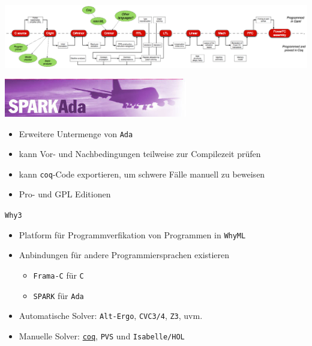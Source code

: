 \documentclass[aspectratio=169]{beamer}
\begin{document}
\begin{frame}
  \begin{center}
    \includegraphics[width=20.0cm]{compcert_diagram.png}
  \end{center}
\end{frame}
\begin{frame}
  \begin{center}
    \includegraphics[width=8.0cm]{spark_logo.jpg}    
  \end{center}
  \begin{itemize}
  \item Erweitere Untermenge von \texttt{Ada}
  \item kann Vor- und Nachbedingungen teilweise zur Compilezeit prüfen
  \item kann \texttt{coq}-Code exportieren, um schwere Fälle manuell zu beweisen
  \item Pro- und GPL Editionen
  \end{itemize}
\end{frame}
\begin{frame}
  \begin{center}
    \Large{\texttt{Why3}}
  \end{center}
  \begin{itemize}
  \item Platform für Programmverfikation von Programmen in \texttt{WhyML}
  \item Anbindungen für andere Programmiersprachen existieren
    \begin{itemize}
    \item \texttt{Frama-C} für \texttt{C}
    \item \texttt{SPARK} für \texttt{Ada}
    \end{itemize}
  \item Automatische Solver: \texttt{Alt-Ergo}, \texttt{CVC3/4}, \texttt{Z3}, uvm. 
  \item Manuelle Solver: \underline{\texttt{coq}}, \texttt{PVS} und \texttt{Isabelle/HOL}
  \end{itemize}
\end{frame}
\end{document}
